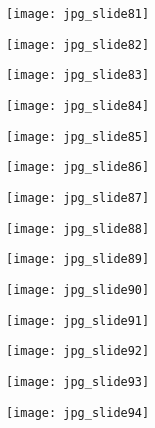 \documentclass[main.tex]{subfiles}
\begin{document}
\begin{center}
\texttt{[image: jpg\_slide81]}
\end{center}

\begin{center}
\texttt{[image: jpg\_slide82]}
\end{center}

\begin{center}
\texttt{[image: jpg\_slide83]}
\end{center}

\begin{center}
\texttt{[image: jpg\_slide84]}
\end{center}

\begin{center}
\texttt{[image: jpg\_slide85]}
\end{center}

\begin{center}
\texttt{[image: jpg\_slide86]}
\end{center}

\begin{center}
\texttt{[image: jpg\_slide87]}
\end{center}

\begin{center}
\texttt{[image: jpg\_slide88]}
\end{center}

\begin{center}
\texttt{[image: jpg\_slide89]}
\end{center}

\begin{center}
\texttt{[image: jpg\_slide90]}
\end{center}

\begin{center}
\texttt{[image: jpg\_slide91]}
\end{center}

\begin{center}
\texttt{[image: jpg\_slide92]}
\end{center}

\begin{center}
\texttt{[image: jpg\_slide93]}
\end{center}

\begin{center}
\texttt{[image: jpg\_slide94]}
\end{center}
\end{document}
